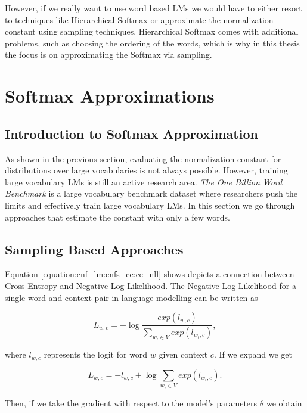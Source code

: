 However, if we really want to use word based LMs we would have to either resort to techniques like Hierarchical Softmax \citep{morin2005hierarchical} or approximate the normalization constant using sampling techniques. Hierarchical Softmax comes with additional problems, such as choosing the ordering of the words, which is why in this thesis the focus is on approximating the Softmax via sampling.

\section{Softmax Approximations}
\label{section:cnf_lm:softmax_approximations}
\subsection{Introduction to Softmax Approximation}

As shown in the previous section, evaluating the normalization constant for distributions over large vocabularies is not always possible. However, training large vocabulary LMs is still an active research area. \emph{The One Billion Word Benchmark} \citep{chelba2013one} is a large vocabulary benchmark dataset where researchers push the limits and effectively train large vocabulary LMs. In this section we go through approaches that estimate the constant with only a few words.

\subsection{Sampling Based Approaches}

Equation \ref{equation:cnf_lm:cnfs_ce:ce_nll} shows depicts a connection between Cross-Entropy and Negative Log-Likelihood. The Negative Log-Likelihood for a single word and context pair in language modelling can be written as

\begin{displaymath}
    L_{w, c} = - \log \frac{exp(l_{w,c})}{\sum_{w_i \in V} exp(l_{w_i,c})},
\end{displaymath}

where $ l_{w,c} $ represents the logit for word $ w $ given context $ c $. If we expand we get

\begin{displaymath}
    L_{w, c} = - l_{w, c} + \log \sum_{w_i \in V} exp(l_{w_i,c}).
\end{displaymath}

Then, if we take the gradient with respect to the model's parameters $ \theta $ we obtain

